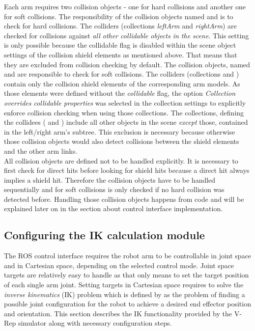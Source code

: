 Each arm requires two collision objects - one for hard collisions and another one for soft collisions. The responsibility of the collision objects named  and  is to check for hard collisions. The colliders (collections \emph{leftArm} and \emph{rightArm}) are checked for collisions against \emph{all other collidable objects in the scene}. This setting is only possible because the collidable flag is disabled within the scene object settings of the collision shield elements as mentioned above. That means that they are excluded from collision checking by default. The collision objects, named  and  are responsible to check for soft collisions. The colliders (collections  and ) contain only the collision shield elements of the corresponding arm models. As those elements were defined without the \emph{collidable} flag, the option \emph{Collection overrides collidable properties} was selected in the collection settings to explicitly enforce collision checking when using those collections. The collections, defining the collidees ( and ) include all other objects in the scene \emph{except} those, contained in the left/right arm's subtree. This exclusion is necessary because otherwise those collision objects would also detect collisions between the shield elements and the other arm links.\\

All collision objects are defined not to be handled explicitly. It is necessary to first check for direct hits before looking for shield hits because a direct hit always implies a shield hit. Therefore the collision objects have to be handled sequentially and for soft collisions is only checked if no hard collision was detected before. Handling those collision objects happens from code and will be explained later on in the section about control interface implementation.

\subsection{Configuring the IK calculation module}
\label{sec:config_ik}

The ROS control interface requires the robot arm to be controllable in joint space and in Cartesian space, depending on the selected control mode. Joint space targets are relatively easy to handle as that only means to set the target position of each single arm joint. Setting targets in Cartesian space requires to solve the \emph{inverse kinematics} (IK) problem which is defined by \citep{craig2005} as the problem of finding a possible joint configuration for the robot to achieve a desired end effector position and orientation. This section describes the IK functionality provided by the V-Rep simulator along with necessary configuration steps.\\

